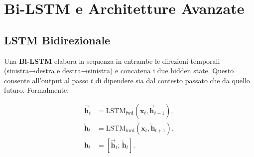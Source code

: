 \begin{table}[H]
  \centering
  \caption{Confronto tra LSTM e GRU.}
  \label{tab:lstm-gru}
  \small
\end{table}

\section{Bi-LSTM e Architetture Avanzate}
\label{sec:bilstm}

\subsection{LSTM Bidirezionale}
\label{subsec:bilstm}

Una \textbf{Bi-LSTM} elabora la sequenza in entrambe le direzioni temporali
(sinistra→destra e destra→sinistra) e concatena i due hidden state. Questo
consente all'output al passo $t$ di dipendere sia dal contesto passato che da
quello futuro. Formalmente:

\begin{align}
  \overrightarrow{\mathbf{h}}_t &= \mathrm{LSTM}_{\text{fwd}}(\mathbf{x}_t,
                                    \overrightarrow{\mathbf{h}}_{t-1}), \\
  \overleftarrow{\mathbf{h}}_t  &= \mathrm{LSTM}_{\text{bwd}}(\mathbf{x}_t,
                                    \overleftarrow{\mathbf{h}}_{t+1}), \\
  \mathbf{h}_t                  &= \left[\overrightarrow{\mathbf{h}}_t;\,
                                    \overleftarrow{\mathbf{h}}_t\right].
\end{align}

